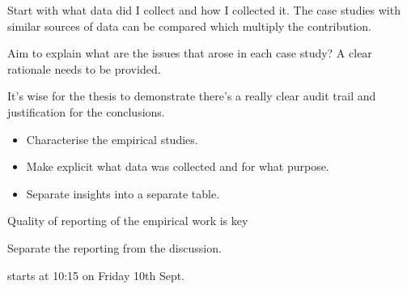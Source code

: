 Start with what data did I collect and how I collected it. The case studies with similar sources of data can be compared which multiply the contribution.

Aim to explain what are the issues that arose in each case study?
A clear rationale needs to be provided. 

It's wise for the thesis to demonstrate there's a really clear audit trail and justification for the conclusions.

\begin{itemize}
    \item Characterise the empirical studies.
    \item Make explicit what data was collected and for what purpose. 
    \item Separate insights into a separate table. 
\end{itemize}

Quality of reporting of the empirical work is key


Separate the reporting from the discussion.

 starts at 10:15 on Friday 10th Sept.

